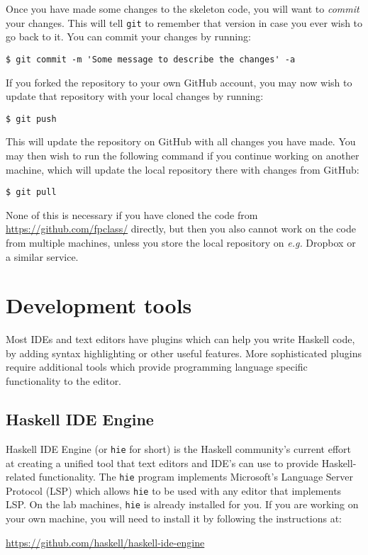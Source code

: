 
Once you have made some changes to the skeleton code, you will want to \emph{commit} your changes. This will tell \texttt{\small git} to remember that version in case you ever wish to go back to it. You can commit your changes by running:
\begin{verbatim}
$ git commit -m 'Some message to describe the changes' -a
\end{verbatim}
If you forked the repository to your own GitHub account, you may now wish to update that repository with your local changes by running:
\begin{verbatim}
$ git push
\end{verbatim}
This will update the repository on GitHub with all changes you have made. You may then wish to run the following command if you continue working on another machine, which will update the local repository there with changes from GitHub:
\begin{verbatim}
$ git pull
\end{verbatim}
None of this is necessary if you have cloned the code from {\small \url{https://github.com/fpclass/}} directly, but then you also cannot work on the code from multiple machines, unless you store the local repository on \emph{e.g.} Dropbox or a similar service. 

\section{Development tools}
\label{sec:dev-tools}

Most IDEs and text editors have plugins which can help you write Haskell code, by adding syntax highlighting or other useful features. More sophisticated plugins require additional tools which provide programming language specific functionality to the editor. 

\subsection{Haskell IDE Engine}

Haskell IDE Engine (or \texttt{\small hie} for short) is the Haskell community's current effort at creating a unified tool that text editors and IDE's can use to provide Haskell-related functionality. The \texttt{\small hie} program implements Microsoft's Language Server Protocol (LSP) which allows \texttt{\small hie} to be used with any editor that implements LSP. On the lab machines, \texttt{\small hie} is already installed for you. If you are working on your own machine, you will need to install it by following the instructions at:
\begin{center}\small
	\url{https://github.com/haskell/haskell-ide-engine}
\end{center}

